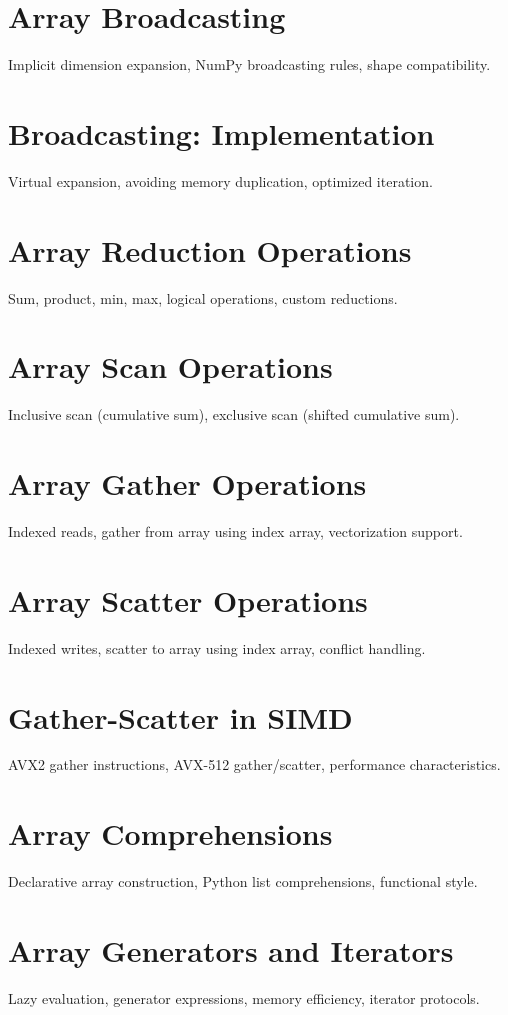\chapter{Array Broadcasting}
Implicit dimension expansion, NumPy broadcasting rules, shape compatibility.

\chapter{Broadcasting: Implementation}
Virtual expansion, avoiding memory duplication, optimized iteration.

\chapter{Array Reduction Operations}
Sum, product, min, max, logical operations, custom reductions.

\chapter{Array Scan Operations}
Inclusive scan (cumulative sum), exclusive scan (shifted cumulative sum).

\chapter{Array Gather Operations}
Indexed reads, gather from array using index array, vectorization support.

\chapter{Array Scatter Operations}
Indexed writes, scatter to array using index array, conflict handling.

\chapter{Gather-Scatter in SIMD}
AVX2 gather instructions, AVX-512 gather/scatter, performance characteristics.

\chapter{Array Comprehensions}
Declarative array construction, Python list comprehensions, functional style.

\chapter{Array Generators and Iterators}
Lazy evaluation, generator expressions, memory efficiency, iterator protocols.

